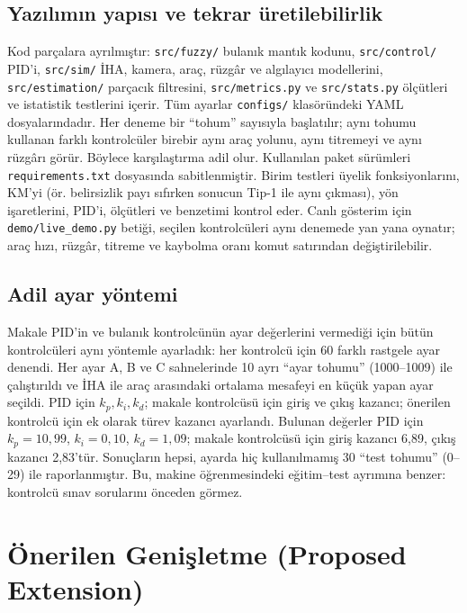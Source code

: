 \documentclass[conference,a4paper]{IEEEtran}
\begin{document}
\subsection{Yazılımın yapısı ve tekrar üretilebilirlik}
Kod parçalara ayrılmıştır: \texttt{src/fuzzy/} bulanık mantık kodunu, \texttt{src/control/} PID'i, \texttt{src/sim/} İHA, kamera, araç, rüzgâr ve algılayıcı modellerini, \texttt{src/estimation/} parçacık filtresini, \texttt{src/metrics.py} ve \texttt{src/stats.py} ölçütleri ve istatistik testlerini içerir. Tüm ayarlar \texttt{configs/} klasöründeki YAML dosyalarındadır. Her deneme bir ``tohum'' sayısıyla başlatılır; aynı tohumu kullanan farklı kontrolcüler birebir aynı araç yolunu, aynı titremeyi ve aynı rüzgârı görür. Böylece karşılaştırma adil olur. Kullanılan paket sürümleri \texttt{requirements.txt} dosyasında sabitlenmiştir. Birim testleri üyelik fonksiyonlarını, KM'yi (ör. belirsizlik payı sıfırken sonucun Tip-1 ile aynı çıkması), yön işaretlerini, PID'i, ölçütleri ve benzetimi kontrol eder. Canlı gösterim için \texttt{demo/live\_demo.py} betiği, seçilen kontrolcüleri aynı denemede yan yana oynatır; araç hızı, rüzgâr, titreme ve kaybolma oranı komut satırından değiştirilebilir.

\subsection{Adil ayar yöntemi}
Makale PID'in ve bulanık kontrolcünün ayar değerlerini vermediği için bütün kontrolcüleri aynı yöntemle ayarladık: her kontrolcü için 60 farklı rastgele ayar denendi. Her ayar A, B ve C sahnelerinde 10 ayrı ``ayar tohumu'' (1000--1009) ile çalıştırıldı ve İHA ile araç arasındaki ortalama mesafeyi en küçük yapan ayar seçildi. PID için $k_p,k_i,k_d$; makale kontrolcüsü için giriş ve çıkış kazancı; önerilen kontrolcü için ek olarak türev kazancı ayarlandı. Bulunan değerler PID için $k_p=10{,}99$, $k_i=0{,}10$, $k_d=1{,}09$; makale kontrolcüsü için giriş kazancı 6,89, çıkış kazancı 2,83'tür. Sonuçların hepsi, ayarda hiç kullanılmamış 30 ``test tohumu'' (0--29) ile raporlanmıştır. Bu, makine öğrenmesindeki eğitim--test ayrımına benzer: kontrolcü sınav sorularını önceden görmez.

\section{Önerilen Genişletme (Proposed Extension)}
\end{document}
